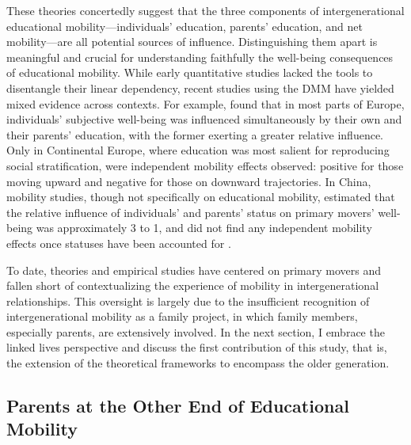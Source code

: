 These theories concertedly suggest that the three components of intergenerational educational mobility—individuals' education, parents' education, and net mobility—are all potential sources of influence. Distinguishing them apart is meaningful and crucial for understanding faithfully the well-being consequences of educational mobility. While early quantitative studies lacked the tools to disentangle their linear dependency, recent studies using the DMM have yielded mixed evidence across contexts. For example, \textcite{schuckDoesIntergenerationalEducational2018} found that in most parts of Europe, individuals' subjective well-being was influenced simultaneously by their own and their parents' education, with the former exerting a greater relative influence. Only in Continental Europe, where education was most salient for reproducing social stratification, were independent mobility effects observed: positive for those moving upward and negative for those on downward trajectories. In China, mobility studies, though not specifically on educational mobility, estimated that the relative influence of individuals' and parents' status on primary movers' well-being was approximately 3 to 1, and did not find any independent mobility effects once statuses have been accounted for \parencite{zangFrustratedAchieversSatisfied2016,zhaoDifferentialAcculturationStudy2019,zhaoInterIntragenerationalSocial2017}.

To date, theories and empirical studies have centered on primary movers and fallen short of contextualizing the experience of mobility in intergenerational relationships. This oversight is largely due to the insufficient recognition of intergenerational mobility as a family project, in which family members, especially parents, are extensively involved. In the next section, I embrace the linked lives perspective and discuss the first contribution of this study, that is, the extension of the theoretical frameworks to encompass the older generation.

\subsection{Parents at the Other End of Educational Mobility}

